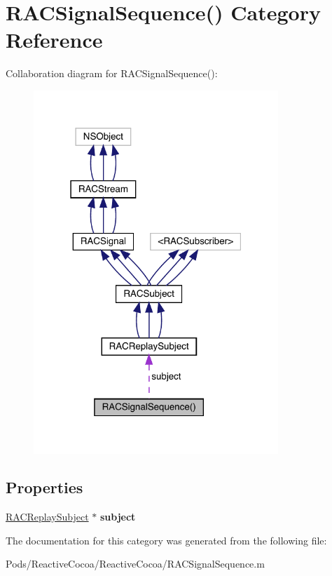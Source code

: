 \hypertarget{category_r_a_c_signal_sequence_07_08}{}\section{R\+A\+C\+Signal\+Sequence() Category Reference}
\label{category_r_a_c_signal_sequence_07_08}


Collaboration diagram for R\+A\+C\+Signal\+Sequence()\+:\nopagebreak
\begin{figure}[H]
\begin{center}
\leavevmode
\includegraphics[width=262pt]{category_r_a_c_signal_sequence_07_08__coll__graph}
\end{center}
\end{figure}
\subsection*{Properties}
\begin{DoxyCompactItemize}
\item 
\mbox{\label{category_r_a_c_signal_sequence_07_08_a57ca8c4f1a6a90ec3a33be33387a84b6}} 
\mbox{\hyperlink{interface_r_a_c_replay_subject}{R\+A\+C\+Replay\+Subject}} $\ast$ {\bfseries subject}
\end{DoxyCompactItemize}


The documentation for this category was generated from the following file\+:\begin{DoxyCompactItemize}
\item 
Pods/\+Reactive\+Cocoa/\+Reactive\+Cocoa/R\+A\+C\+Signal\+Sequence.\+m\end{DoxyCompactItemize}
